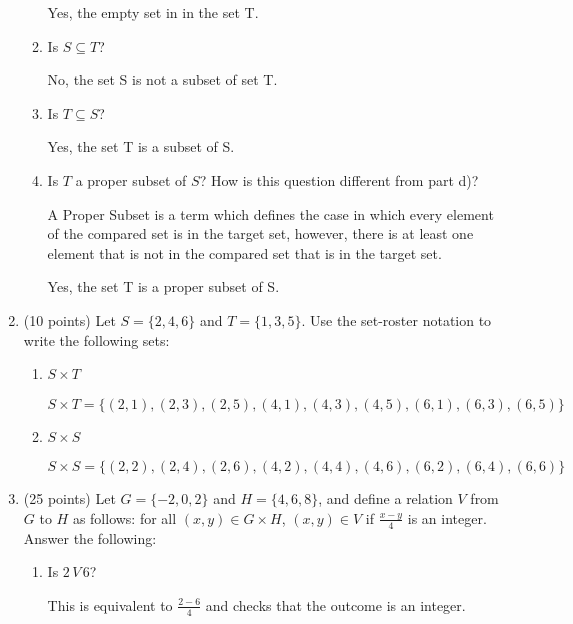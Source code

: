 \documentclass[12pt]{article}
\begin{document}
\begin{enumerate}
\begin{enumerate}
		            Yes, the empty set in in the set T.
		      \item Is \( S \subseteq T \)?
		            
		            No, the set S is not a subset of set T.
		      \item Is \( T \subseteq S \)?
		            
		            Yes, the set T is a subset of S.
		      \item Is \( T \) a proper subset of \( S \)? How is this question different from part d)?
		            
		            A Proper Subset is a term which defines the case in
		            which every element of the compared set is in the
		            target set, however, there is at least one element
		            that is not in the compared set that is in the target
		            set.
		            
		            Yes, the set T is a proper subset of S.
	      \end{enumerate}
	\item (10 points) Let \( S = \{2, 4, 6\} \) and \( T = \{1, 3, 5\} \). Use the set-roster notation to write the following sets:
	      \begin{enumerate}
		      \item \( S \times T \)
		            
		            \[
			            S \times T = \{(2, 1), (2, 3), (2, 5), (4, 1), (4, 3), (4, 5), (6, 1), (6, 3), (6, 5)\}
		            \]
		            
		      \item \( S \times S \)
		            
		            \[
			            S \times S = \{(2, 2), (2, 4), (2, 6), (4, 2), (4, 4), (4, 6), (6, 2), (6, 4), (6, 6)\}
		            \]
	      \end{enumerate}
	\item (25 points) Let \( G = \{-2, 0, 2\} \) and \( H = \{4, 6, 8\} \), and define a relation \( V \) from \( G \) to \( H \) as follows: for all \( (x, y) \in G \times H \), \( (x, y) \in V \) if \( \frac{x-y}{4} \) is an integer. Answer the following:
	      \begin{enumerate}
		      \item Is \( 2 \, V \, 6 \)?
		            
		            This is equivalent to \(\frac{2-6}{4}\) and checks that
		            the outcome is an integer. 
		            

\end{enumerate}
\end{enumerate}
\end{document}
